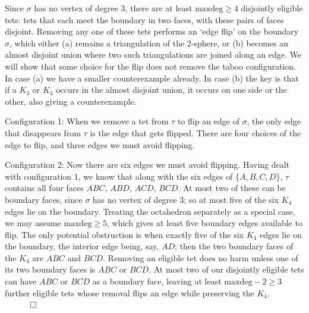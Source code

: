 \documentclass[12pt]{article}
\newcommand{\proofend}{$\quad \qed$}
\newcommand{\kw}{\mathrm}
\newcommand{\maxdeg}{\kw{maxdeg}}
\begin{document}
Since $\sigma$ has no vertex of degree $3$, there are at least
$\maxdeg \geq 4$ disjointly eligible tets: tets that each meet the
boundary in two faces, with these pairs of faces disjoint.
Removing any one of these tets performs an `edge flip' on the boundary
$\sigma$,
which either (a) remains a triangulation of the 2-sphere,
or (b) becomes an almost disjoint union where
two such triangulations are joined along an edge.
We will show that some choice for the flip does not remove the taboo
configuration.
In case (a) we have a smaller counterexample already.
In case (b) the key is that if a $K_3$ or $K_4$ occurs
in the almost disjoint union, it occurs on one side or the other,
also giving a counterexample.

Configuration 1:
When we remove a tet from $\tau$ to flip an edge of $\sigma$,
the only edge that disappears from $\tau$ is the edge that gets flipped.
There are four choices of the edge to flip, and three edges we must
avoid flipping.

Configuration 2:
Now there are six edges we must avoid flipping. Having dealt with
configuration 1, we know that along with the six edges of $\{A,B,C,D\}$,
$\tau$ contains all four faces $ABC$, $ABD$, $ACD$, $BCD$. At most two of
these can be boundary faces, since $\sigma$ has no vertex of degree $3$;
so at most five of the six $K_4$ edges lie on the boundary. Treating the
octahedron separately as a special case, we may assume $\maxdeg \geq 5$,
which gives at least five boundary edges available to flip. The only
potential obstruction is when exactly five of the six $K_4$ edges lie on
the boundary, the interior edge being, say, $AD$; then the two boundary
faces of the $K_4$ are $ABC$ and $BCD$. Removing an eligible tet does no
harm unless one of its two boundary faces is $ABC$ or $BCD$. At most two
of our disjointly eligible tets can have $ABC$ or $BCD$ as a boundary
face, leaving at least $\maxdeg-2 \geq 3$ further eligible tets whose
removal flips an edge while preserving the $K_4$.
\proofend



\end{document}
